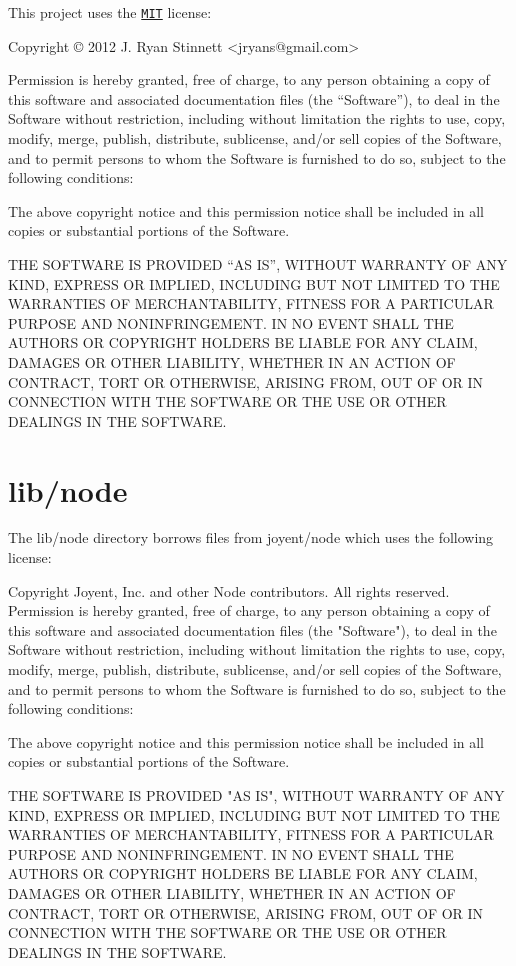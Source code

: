 This project uses the \href{http://jryans.mit-license.org/}{\tt M\+IT} license\+: \begin{DoxyVerb}Copyright © 2012 J. Ryan Stinnett <jryans@gmail.com>

Permission is hereby granted, free of charge, to any person obtaining a
copy of this software and associated documentation files (the “Software”),
to deal in the Software without restriction, including without limitation
the rights to use, copy, modify, merge, publish, distribute, sublicense,
and/or sell copies of the Software, and to permit persons to whom the
Software is furnished to do so, subject to the following conditions:

The above copyright notice and this permission notice shall be included in
all copies or substantial portions of the Software.

THE SOFTWARE IS PROVIDED “AS IS”, WITHOUT WARRANTY OF ANY KIND, EXPRESS OR
IMPLIED, INCLUDING BUT NOT LIMITED TO THE WARRANTIES OF MERCHANTABILITY,
FITNESS FOR A PARTICULAR PURPOSE AND NONINFRINGEMENT. IN NO EVENT SHALL THE
AUTHORS OR COPYRIGHT HOLDERS BE LIABLE FOR ANY CLAIM, DAMAGES OR OTHER
LIABILITY, WHETHER IN AN ACTION OF CONTRACT, TORT OR OTHERWISE, ARISING
FROM, OUT OF OR IN CONNECTION WITH THE SOFTWARE OR THE USE OR OTHER
DEALINGS IN THE SOFTWARE.
\end{DoxyVerb}


\section*{lib/node}

The {\ttfamily lib/node} directory borrows files from joyent/node which uses the following license\+: \begin{DoxyVerb}Copyright Joyent, Inc. and other Node contributors. All rights reserved.
Permission is hereby granted, free of charge, to any person obtaining a copy
of this software and associated documentation files (the "Software"), to
deal in the Software without restriction, including without limitation the
rights to use, copy, modify, merge, publish, distribute, sublicense, and/or
sell copies of the Software, and to permit persons to whom the Software is
furnished to do so, subject to the following conditions:

The above copyright notice and this permission notice shall be included in
all copies or substantial portions of the Software.

THE SOFTWARE IS PROVIDED "AS IS", WITHOUT WARRANTY OF ANY KIND, EXPRESS OR
IMPLIED, INCLUDING BUT NOT LIMITED TO THE WARRANTIES OF MERCHANTABILITY,
FITNESS FOR A PARTICULAR PURPOSE AND NONINFRINGEMENT. IN NO EVENT SHALL THE
AUTHORS OR COPYRIGHT HOLDERS BE LIABLE FOR ANY CLAIM, DAMAGES OR OTHER
LIABILITY, WHETHER IN AN ACTION OF CONTRACT, TORT OR OTHERWISE, ARISING
FROM, OUT OF OR IN CONNECTION WITH THE SOFTWARE OR THE USE OR OTHER DEALINGS
IN THE SOFTWARE.\end{DoxyVerb}
 